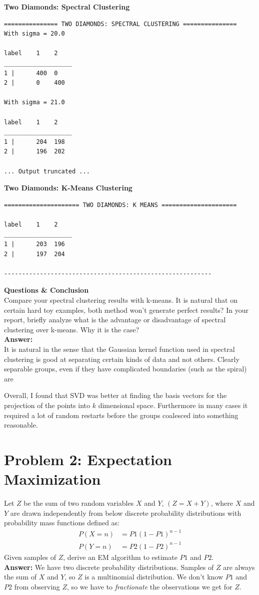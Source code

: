 \documentclass[11pt]{article}
\begin{document}
\textbf{Two Diamonds: Spectral Clustering} 
\begin{verbatim}
=============== TWO DIAMONDS: SPECTRAL CLUSTERING ===============
With sigma = 20.0

label    1    2    
___________________
1 |      400  0    
2 |      0    400    

With sigma = 21.0

label    1    2    
___________________
1 |      204  198    
2 |      196  202    

... Output truncated ... 	

\end{verbatim}
\textbf{Two Diamonds: K-Means Clustering} 
\begin{verbatim}
===================== TWO DIAMONDS: K MEANS =====================

label    1    2    
___________________
1 |      203  196    
2 |      197  204    

----------------------------------------------------------
\end{verbatim}
\textbf{Questions \& Conclusion}
\\[5pt]
Compare your spectral clustering results with k-means. It is natural that on certain hard toy examples, both method won't generate perfect results? In your report, briefly analyze what is the advantage or disadvantage of spectral clustering over k-means. Why it is the case? 
\\[5pt]\textbf{Answer:}\\[5pt]
It is natural in the sense that the Gaussian kernel function used in spectral clustering is good at separating certain kinds of data and not others. Clearly separable groups, even if they have complicated boundaries (such as the spiral) are

Overall, I found that SVD was better at finding the basis vectors for the projection of the points into $k$ dimensional space. Furthermore in many cases it required a lot of random restarts before the groups coalesced into something reasonable. 
\section*{Problem 2: Expectation Maximization}

Let $Z$ be the sum of two random variables $X$ and $Y$, $(Z=X+Y)$, where $X$ and $Y$ are drawn independently from below discrete probability distributions with probability mass functions defined as:
\begin{align}
P(X=n) &= P1(1-P1)^{n-1}\\
P(Y=n) &= P2(1-P2)^{n-1}
\end{align}
Given samples of $Z$, derive an EM algorithm to estimate $P1$ and $P2$.
\\[5pt]\textbf{Answer:}
We have two discrete probability distributions. Samples of $Z$ are always the sum of $X$ and $Y$, so $Z$ is a multinomial distribution. We don't know $P1$ and $P2$ from observing $Z$, so we have to \textit{fractionate} the observations we get for $Z$.
\end{document}
